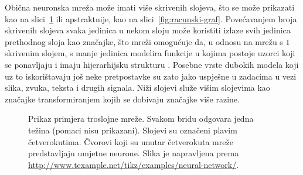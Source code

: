 \documentclass[utf8, diplomski, lmodern]{fer}
\begin{document}
Obična neuronska mreža može imati više skrivenih slojeva, što se može prikazati kao na slici~\ref{fig:neuronska-mreza} ili apstraktnije, kao na slici~\ref{fig:racunski-graf}. Povećavanjem broja skrivenih slojeva svaka jedinica u nekom sloju može koristiti izlaze svih jedinica prethodnog sloja kao značajke, što mreži omogućuje da, u odnosu na mrežu s $1$ skrivenim slojem, s manje jedinica modelira funkcije u kojima postoje uzorci koji se ponavljaju i imaju hijerarhijsku strukturu \citep{Goodfellow:2016:DL}. Posebne vrste dubokih modela koji uz to iskorištavaju još neke pretpostavke su zato jako uspješne u zadacima u vezi slika, zvuka, teksta i drugih signala. Niži slojevi služe višim slojevima kao značajke transformiranjem kojih se dobivaju značajke više razine.

\begin{figure}
\centering
{}
\caption{Prikaz primjera troslojne mreže. Svakom bridu odgovara jedna težina (pomaci nisu prikazani). Slojevi su označeni plavim četverokutima. Čvorovi koji su unutar četverokuta mreže predstavljaju umjetne neurone. Slika je napravljena prema \url{http://www.texample.net/tikz/examples/neural-network/}.}
\label{fig:neuronska-mreza}
\end{figure}
\end{document}
